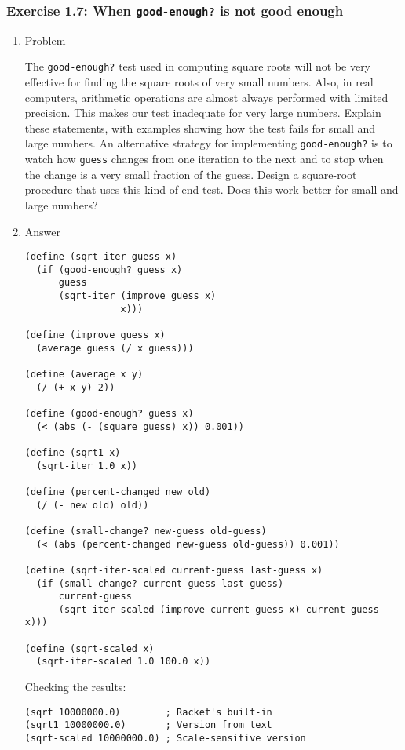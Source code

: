 \documentclass[11pt]{article}
\begin{document}
\subsubsection{Exercise 1.7: When \texttt{good-enough?} is not good enough}
\label{sec-1-2-2}
\begin{enumerate}
\item Problem
\label{sec-1-2-2-1}

The \texttt{good-enough?} test used in computing square roots will not
be very effective for finding the square roots of very small
numbers.  Also, in real computers, arithmetic operations are
almost always performed with limited precision.  This makes our
test inadequate for very large numbers.  Explain these
statements, with examples showing how the test fails for small
and large numbers.  An alternative strategy for implementing
\texttt{good-enough?} is to watch how \texttt{guess} changes from one iteration
to the next and to stop when the change is a very small fraction
of the guess.  Design a square-root procedure that uses this kind
of end test.  Does this work better for small and large numbers?
\item Answer
\label{sec-1-2-2-2}
\begin{verbatim}
(define (sqrt-iter guess x)
  (if (good-enough? guess x)
      guess
      (sqrt-iter (improve guess x)
                 x)))

(define (improve guess x)
  (average guess (/ x guess)))

(define (average x y)
  (/ (+ x y) 2))

(define (good-enough? guess x)
  (< (abs (- (square guess) x)) 0.001))

(define (sqrt1 x)
  (sqrt-iter 1.0 x))

(define (percent-changed new old)
  (/ (- new old) old))

(define (small-change? new-guess old-guess)
  (< (abs (percent-changed new-guess old-guess)) 0.001))

(define (sqrt-iter-scaled current-guess last-guess x)
  (if (small-change? current-guess last-guess)
      current-guess
      (sqrt-iter-scaled (improve current-guess x) current-guess x)))

(define (sqrt-scaled x)
  (sqrt-iter-scaled 1.0 100.0 x))
\end{verbatim}

Checking the results:

\begin{verbatim}
(sqrt 10000000.0)        ; Racket's built-in
(sqrt1 10000000.0)       ; Version from text
(sqrt-scaled 10000000.0) ; Scale-sensitive version
\end{verbatim}


\end{enumerate}
\end{document}
